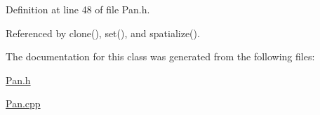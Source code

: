Definition at line 48 of file Pan.h.

Referenced by clone(), set(), and spatialize().

The documentation for this class was generated from the following files:\begin{CompactItemize}
\item 
\hyperlink{Pan_8h}{Pan.h}\item 
\hyperlink{Pan_8cpp}{Pan.cpp}\end{CompactItemize}
